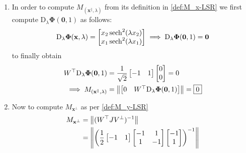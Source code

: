 \documentclass[letterpaper, 10 pt, conference, dvipsnames]{ieeeconf}
\begin{document}
\begin{enumerate}
          Hence, we obtain \(V\) and \(V^\perp\) as defined as \eqref{def:V} and \(W\) as defined in \eqref{def:W} \(\implies V=\mathbf{v}_1, V^\perp=\mathbf{v}_2, W=\mathbf{v}_2\)
    \item In order to compute \(M_{(\mathbf{x}^\parallel,\lambda)}\) from its definition in \eqref{def:M_x-LSR} we first compute \(\mathrm{D}_{\lambda}\boldsymbol{\Phi}(\mathbf{0},1)\) as follows:
          \begin{equation*}
              \mathrm{D}_{\lambda}\boldsymbol{\Phi}(\mathbf{x},\lambda) = \begin{bmatrix}x_2\sech^2(\lambda x_2)\\x_1\sech^2(\lambda x_1)\end{bmatrix} \implies \mathrm{D}_{\lambda}\boldsymbol{\Phi}(\mathbf{0},1) = \mathbf{0}
          \end{equation*}
          to finally obtain
          \begin{align*}
              W^\top\mathrm{D}_\lambda\boldsymbol{\Phi}(\mathbf{0},1) & = \frac{1}{\sqrt{2}}\begin{bmatrix}-1&1\end{bmatrix}\begin{bmatrix}0\\0\end{bmatrix} = 0                    \\
              \implies M_{(\mathbf{x}^\parallel,\lambda)}             & = \norm{\begin{bmatrix}0 &W^\top\mathrm{D}_\lambda\boldsymbol{\Phi}(\mathbf{0},1)\end{bmatrix}} = \boxed{0}
          \end{align*}
    \item Now to compute \(M_{\mathbf{x}^\perp}\) as per \eqref{def:M_y-LSR}
          \begin{align*}
              M_{\mathbf{x}^\perp} & = \norm{(W^\top J V^{\perp})^{-1}}                                                                                                        \\
                                   & = \norm{\left(\frac12\begin{bmatrix}-1&1\end{bmatrix}\begin{bmatrix}-1&1\\1&-1\end{bmatrix}\begin{bmatrix}-1\\1\end{bmatrix}\right)^{-1}} \\

\end{align*}
\end{enumerate}
\end{document}
